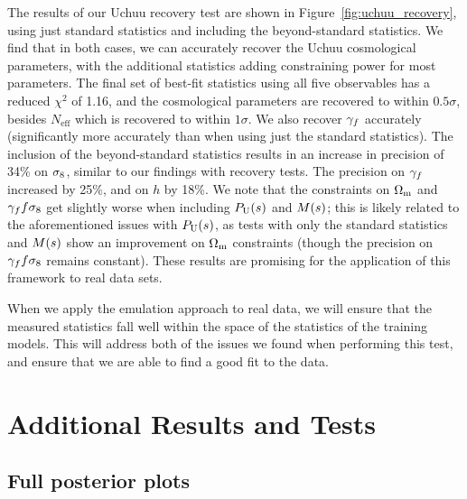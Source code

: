 The results of our Uchuu recovery test are shown in Figure~\ref{fig:uchuu_recovery}, using just standard statistics and including the beyond-standard statistics.
We find that in both cases, we can accurately recover the Uchuu cosmological parameters, with the additional statistics adding constraining power for most parameters.
The final set of best-fit statistics using all five observables has a reduced $\chi^2$ of 1.16, and the cosmological parameters are recovered to within $0.5\sigma$, besides $N_\mathrm{eff}$ which is recovered to within $1\sigma$.
We also recover $\gamma_f$ accurately (significantly more accurately than when using just the standard statistics).
The inclusion of the beyond-standard statistics results in an increase in precision of 34\% on $\sigma_\mathrm{8}$, similar to our findings with \aemulus recovery tests.
The precision on $\gamma_f$ increased by 25\%, and on $h$ by 18\%. 
We note that the constraints on $\Omega_\mathrm{m}$ and $\gamma_f f\sigma_8$ get slightly worse when including $P_\mathrm{U}(s)$ and $M(s)$; this is likely related to the aforementioned issues with $P_\mathrm{U}(s)$, as tests with only the standard statistics and $M(s)$ show an improvement on $\Omega_\mathrm{m}$ constraints (though the precision on $\gamma_f f\sigma_8$ remains constant).
These results are promising for the application of this framework to real data sets.

When we apply the emulation approach to real data, we will ensure that the measured statistics fall well within the space of the statistics of the training models.
This will address both of the issues we found when performing this test, and ensure that we are able to find a good fit to the data.



\section{Additional Results and Tests}

\subsection{Full posterior plots}

